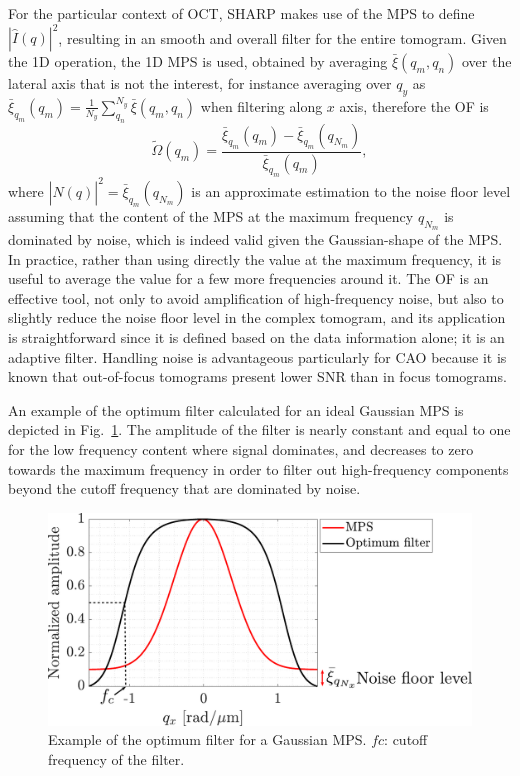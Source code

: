 For the particular context of OCT, SHARP makes use of the MPS to define $|\hat{I}(q)|^2$, resulting in an smooth and overall filter for the entire tomogram. Given the 1D operation, the 1D MPS is used, obtained by averaging $\bar{\xi}(q_m,q_n)$ over the lateral axis that is not the interest, for instance averaging over $q_y$ as $\bar{\xi}_{q_m}(q_m) = \frac{1}{N_y}\sum_{q_n}^{N_y}\bar{\xi}(q_m,q_n)$ when filtering along $x$ axis, therefore the OF is
\begin{equation}
    \tilde{\Omega}(q_m) = \frac{\bar{\xi}_{q_m}(q_m) - \bar{\xi}_{q_m}(q_{N_m})}{\bar{\xi}_{q_m}(q_m)},
\end{equation}
where $|\hat{N}(q)|^2 = \bar{\xi}_{q_m}(q_{N_m})$ is an approximate estimation to the noise floor level assuming that the content of the MPS at the maximum frequency $q_{N_m}$ is dominated by noise, which is indeed valid given the Gaussian-shape of the MPS. In practice, rather than using directly the value at the maximum frequency, it is useful to average the value for a few more frequencies around it. The OF is an effective tool, not only to avoid amplification of high-frequency noise, but also to slightly reduce the noise floor level in the complex tomogram, and its application is straightforward since it is defined based on the data information alone; it is an adaptive filter. Handling noise is advantageous particularly for CAO because it is known that out-of-focus tomograms present lower SNR than in focus tomograms. 

An example of the optimum filter calculated for an ideal Gaussian MPS is depicted in Fig.~\ref{fig:OptimumFilter}. The amplitude of the filter is nearly constant and equal to one for the low frequency content where signal dominates, and decreases to zero towards the maximum frequency in order to filter out high-frequency components beyond the cutoff frequency that are dominated by noise.

\begin{figure}[htb!]
	\centering
	\includegraphics[width=.7\textwidth]{Figures/SHARP/OptimumFilterExample.pdf}
	\caption[Example of the optimum filter for a Gaussian MPS.]{Example of the optimum filter for a Gaussian MPS. $fc$: cutoff frequency of the filter.}
	\label{fig:OptimumFilter}
\end{figure}

